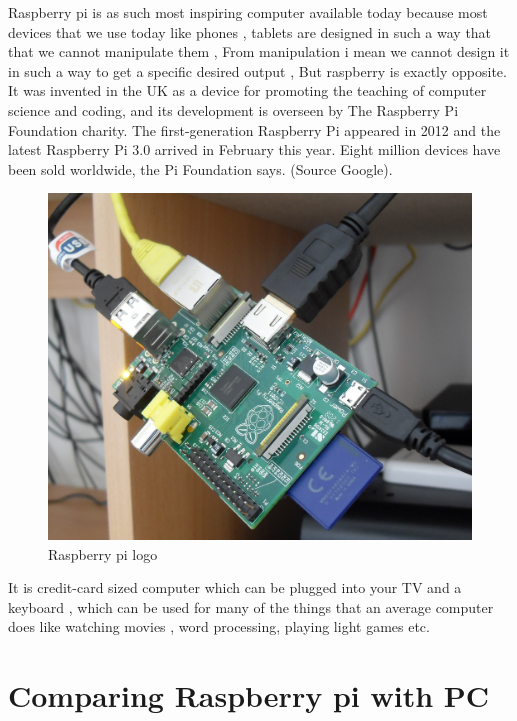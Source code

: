 Raspberry pi is as such most inspiring computer available today because most devices that we use today like phones , tablets are designed in such a way that that we cannot manipulate them , From manipulation i mean we cannot design it in such a way to get a specific desired output , But raspberry is exactly opposite.
It was invented in the UK as a device for promoting the teaching of computer science and coding, and its development is overseen by The Raspberry Pi Foundation charity. The first-generation Raspberry Pi appeared in 2012 and the latest Raspberry Pi 3.0 arrived in February this year. Eight million devices have been sold worldwide, the Pi Foundation says. (Source Google).
\begin{figure}[ht]
\centering
\includegraphics[scale=0.3]{images/rasp1.jpg}
\caption{Raspberry pi logo}
\end{figure}
It is credit-card sized computer which can be plugged into your TV and a keyboard , which can be used for many of the things that an  average computer does like watching movies , word processing, playing light games etc.

\section{Comparing Raspberry pi with PC}


